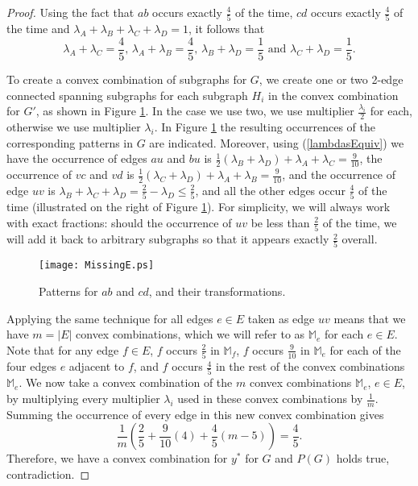 \documentclass[oneeqnum,final]{siamltex1213}
\begin{document}
\begin{proof}
Using the fact that $ab$ occurs exactly $\frac{4}{5}$ of the time, $cd$ occurs exactly $\frac{4}{5}$ of the time and $\lambda_{A} + \lambda_{B} + \lambda_{C} + \lambda_{D} = 1$, it follows that
\begin{equation} \label{lambdasEquiv}
\lambda_{A} + \lambda_{C} = \frac{4}{5} \text{, }
\lambda_{A} + \lambda_{B} = \frac{4}{5} \text{, }
\lambda_{B} + \lambda_{D} = \frac{1}{5} \text{ and }
\lambda_{C} + \lambda_{D} = \frac{1}{5} \text{.}
\end{equation}

To create a convex combination of subgraphs for $G$, we create one or two \mbox{2-edge} connected spanning subgraphs for each subgraph $H_{i}$ in the convex combination for $G'$, as shown in Figure \ref{PatternsToMissingEdge}. In the case we use two, we use multiplier $\frac{\lambda_{i}}{2}$ for each, otherwise we use multiplier $\lambda_{i}$. In Figure \ref{PatternsToMissingEdge} the resulting occurrences of the corresponding patterns in $G$ are indicated. Moreover, using (\ref{lambdasEquiv}) we have the occurrence of edges $au$ and $bu$ is $\frac{1}{2}(\lambda_{B} + \lambda_{D}) + \lambda_{A} + \lambda_{C} = \frac{9}{10}$, the occurrence of $vc$ and $vd$ is $\frac{1}{2}(\lambda_{C} + \lambda_{D}) + \lambda_{A} + \lambda_{B} = \frac{9}{10}$, and the occurrence of edge $uv$ is $\lambda_{B} +\lambda_{C}+\lambda_{D} = \frac{2}{5} - \lambda_{D}\le \frac{2}{5}$, and all the other edges occur $\frac{4}{5}$ of the time (illustrated on the right of Figure \ref{PatternsToMissingEdge}). For simplicity, we will always work with exact fractions: should the occurrence of $uv$ be less than $\frac{2}{5}$ of the time, we will add it back to arbitrary subgraphs so that it appears exactly $\frac{2}{5}$ overall.

\begin{figure}
\begin{center}
\texttt{[image: MissingE.ps]}
\end{center}
\caption{Patterns for $ab$ and $cd$, and their transformations.}
\label{PatternsToMissingEdge}
\end{figure}

Applying the same technique for all edges $e \in E$ taken as edge $uv$ means that we have $m=|E|$ convex combinations, which we will refer to as $\mathbb{M}_{e}$ for each $e\in E$. Note that for any edge $f\in E$, $f$ occurs $\frac{2}{5}$ in $\mathbb{M}_{f}$, $f$ occurs $\frac{9}{10}$ in $\mathbb{M}_{e}$ for each of the four edges $e$ adjacent to $f$, and $f$ occurs $\frac{4}{5}$ in the rest of the convex combinations $\mathbb{M}_{e}$. We now take a convex combination of the $m$ convex combinations $\mathbb{M}_{e}$, $e\in E$, by multiplying every multiplier $\lambda_{i}$ used in these convex combinations by $\frac{1}{m}$. Summing the occurrence of every edge in this new convex combination gives \[\frac{1}{m}(\frac{2}{5} + \frac{9}{10}(4) + \frac{4}{5}(m-5)) = \frac{4}{5}\text{.}\]Therefore, we have a convex combination for $y^{*}$ for $G$ and $P(G)$ holds true, contradiction.


\end{proof}
\end{document}
